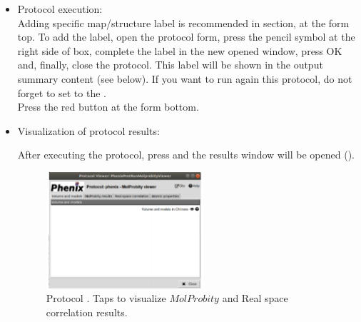 \begin{itemize}
 \item Protocol execution:\\
 Adding specific map/structure label is recommended in  section, at the form top. To add the label, open the protocol form, press the pencil symbol at the right side of  box, complete the label in the new opened window, press OK and, finally, close the protocol. This label will be shown in the output summary content (see below). If you want to run again this protocol, do not forget to set to  the .\\
  Press the  red button at the form bottom.
  
 \item Visualization of protocol results:
  
  After executing the protocol, press  and the results window will be opened (). 
  
  \begin{figure}[H]
     \centering 
     \captionsetup{width=.7\linewidth} 
     \includegraphics[width=0.55\textwidth]{Images_appendix/Fig144.pdf}
     \caption{Protocol . Taps to visualize $MolProbity$  and Real space correlation results.}
     \label{fig:app_protocol_molprobity_2}
    \end{figure}
    

\end{itemize}
